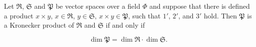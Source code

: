 Let $\Re$, $\mathfrak{S}$ and $\mathfrak{P}$ be vector spaces over a field $\Phi$ and suppose that there is defined a product $x \times y$, $x \in \Re$, $y \in \mathfrak{S}$, $x \times y \in \mathfrak{P}$, such that $1'$, $2'$, and $3'$ hold. Then $\mathfrak{P}$ is a Kronecker product of $\Re$ and $\mathfrak{S}$ if and only if

$$\dim \mathfrak{P} = \dim \Re \cdot \dim \mathfrak{S}.$$
